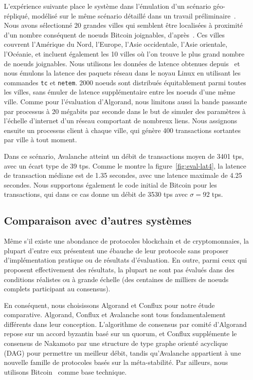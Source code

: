 L'expérience suivante place le système dans l'émulation d'un scénario géo-répliqué, modélisé sur le même scénario
détaillé dans un travail préliminaire~\cite{GiladHMVZ17}.
Nous avons sélectionné 20 grandes villes qui semblent être localisées à proximité d'un nombre conséquent de noeuds
Bitcoin joignables, d'après~\cite{bitnodes2018}. Ces villes couvrent l'Amérique du Nord, l'Europe, l'Asie occidentale,
l'Asie orientale, l'Océanie, et incluent également les 10 villes où l'on trouve le plus grand nombre de noeuds
joignables. Nous utilisons les données de latence obtenues depuis~\cite{wondernetworkping2018} et nous émulons
la latence des paquets réseau dans le noyau Linux en utilisant les commandes \texttt{tc} et \texttt{netem}.
2000 noeuds sont distribués équitablement parmi toutes les villes, sans émuler de latence supplémentaire entre les
noeuds d'une même ville. Comme pour l'évaluation d'Algorand, nous limitons aussi la bande passante par processus
à 20 mégabits par seconde dans le but de simuler des paramètres à l'échelle d'internet d'un réseau comportant de
nombreux liens. Nous assignons ensuite un processus client à chaque ville, qui génère 400 transactions sortantes
par ville à tout moment.

Dans ce scénario, Avalanche atteint un débit de transactions moyen de 3401 tps, avec un écart type de 39 tps. Comme
le montre la figure~\ref{fig:eval-lat4}, la latence de transaction médiane est de 1.35 secondes, avec une latence
maximale de 4.25 secondes. Nous supportons également le code initial de Bitcoin pour les transactions, qui dans ce
cas donne un débit de 3530 tps avec $\sigma = 92$ tps.

\subsection{Comparaison avec d'autres systèmes}

Même s'il existe une abondance de protocoles blockchain et de cryptomonnaies, la plupart d'entre eux présentent
une ébauche de leur protocole sans proposer d'implémentation pratique ou de résultats d'évaluation. En outre, parmi
ceux qui proposent effectivement des résultats, la plupart ne sont pas évalués dans des conditions réalistes ou à
grande échelle (des centaines de milliers de noeuds complets participant au consensus).

En conséquent, nous choisissons Algorand et Conflux pour notre étude comparative. Algorand, Conflux et Avalanche
sont tous fondamentalement différents dans leur conception. L'algorithme de consensus par comité
d'Algorand repose sur un accord byzantin basé sur un quorum, et Conflux supplémente le consensus de Nakamoto par une
structure de type graphe orienté acyclique (DAG) pour permettre un meilleur débit, tandis qu'Avalanche appartient à
une nouvelle famille de protocoles basés sur la méta-stabilité. Par ailleurs, nous utilisons
Bitcoin~\cite{nakamoto2008bitcoin} comme base technique.

